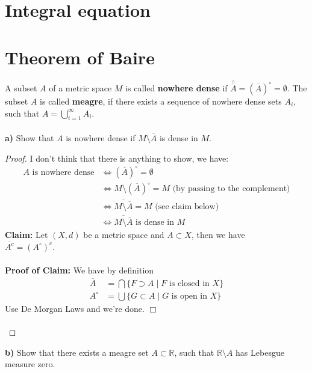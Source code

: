 \documentclass[12pt,a4paper]{article}
\begin{document}
\section{Integral equation}
\section{Theorem of Baire}
A subset $A$ of a metric space $M$ is called \textbf{nowhere dense} if $\overset{\circ}{\overline{A}}=(\overline{A})^\circ = \emptyset$. The subset $A$ is called \textbf{meagre}, if there exists a sequence of nowhere dense sets $A_i$, such that $A= \bigcup_{i=1}^\infty A_i$. 
\\\\
\textbf{a)} Show that $A$ is nowhere dense if $M \setminus \overline{A}$ is dense in $M$. 
\begin{proof}
I don't think that there is anything to show, we have:
\begin{align*}
A \text{ is nowhere dense} &\iff \left( \overline{A}\right)^\circ = \emptyset \\
& \iff M \setminus \left( \overline{A}\right)^\circ = M \text{ (by passing to the complement)} \\
& \iff \overline{M \setminus \overline{A}} = M  \text{ (see claim below)}\\
& \iff \overline{M \setminus \overline{A}} \text{ is dense in } M 
\end{align*}
\textbf{Claim:} Let $(X,d)$ be a metric space and $A \subset X$, then we have \\ $\overline{A^c}= \left(A^\circ \right)^c$. \\
\\
\textbf{Proof of Claim:} We have by definition
\begin{align*}
\overline{A}&= \bigcap \lbrace F \supset A \mid F \text{ is closed in } X \rbrace \\
A^\circ &= \bigcup \lbrace G \subset A \mid G \text{ is open in } X \rbrace 
\end{align*}
Use De Morgan Laws and we're done. \hfill $\Box$
\\\\
\end{proof}
\newpage
\noindent \textbf{b)} Show that there exists a meagre set $A \subset \mathbb{R}$, such that $\mathbb{R} \setminus A$ has Lebesgue measure zero. 
\end{document}
